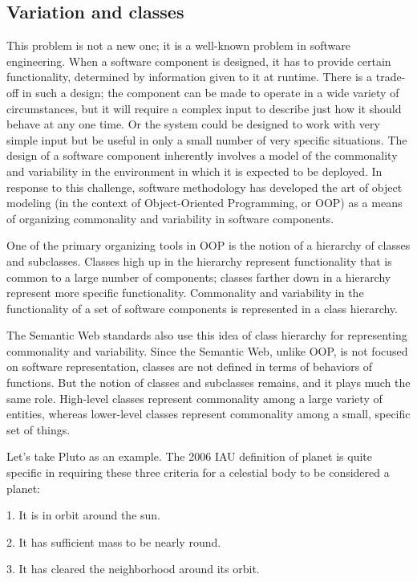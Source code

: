 \subsection{Variation and classes}

This problem is not a new one; it is a well-known problem in software
engineering. When a software component is designed, it has to provide
certain functionality, determined by information given to it at runtime.
There is a trade-off in such a design; the component can be made to
operate in a wide variety of circumstances, but it will require a
complex input to describe just how it should behave at any one time. Or
the system could be designed to work with very simple input but be
useful in only a small number of very specific situations. The design of
a software component inherently involves a model of the commonality and
variability in the environment in which it is expected to be deployed.
In response
to this challenge, software methodology has developed the art of object
modeling (in the context of Object-Oriented Programming, or OOP) as a
means of organizing commonality and variability in software components.

One of the primary organizing tools in OOP is the notion of a hierarchy
of classes and subclasses. Classes high up in the hierarchy represent
functionality that is common to a large number of components; classes
farther down in a hierarchy represent more specific functionality.
Commonality and variability in the functionality of a set of software
components is represented in a class hierarchy.

The Semantic Web standards also use this idea of class hierarchy for
representing commonality and variability. Since the Semantic Web, unlike
OOP, is not focused on software representation, classes are not defined
in terms of behaviors of functions. But the notion of classes and
subclasses remains, and it plays much the same role. High-level classes
represent commonality among a large variety of entities, whereas
lower-level classes represent commonality among a small, specific set of
things.

Let's take Pluto as an example. The 2006 IAU definition of planet is
quite specific in requiring these three criteria for a celestial body to
be considered a planet:

1. It is in orbit around the sun.

2. It has sufficient mass to be nearly round.

3. It has cleared the neighborhood around its orbit.

